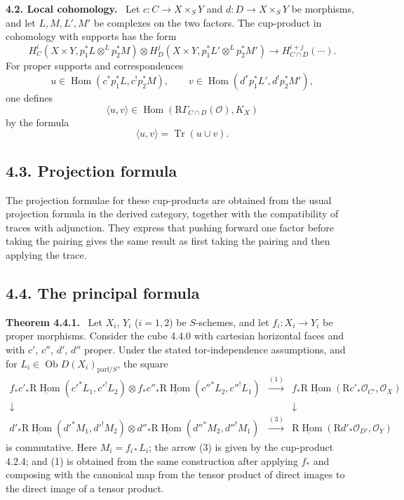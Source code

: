 \documentclass[12pt]{article}
\newcommand{\Hom}{\operatorname{Hom}}
\newcommand{\Tr}{\operatorname{Tr}}
\newcommand{\ob}{\operatorname{Ob}}
\newcommand{\R}{\mathrm R}
\newcommand{\cO}{\mathcal O}
\newenvironment{statement}[1]{\par\medskip\noindent\textbf{#1.}\ }{\par\medskip}
\begin{document}
\begin{statement}{4.2. Local cohomology}
Let $c:C\to X\times_S Y$ and $d:D\to X\times_S Y$ be morphisms, and let $L,M,L',M'$ be complexes on the two factors. The cup-product in cohomology with supports has the form
\begin{equation}
H^i_C(X\times Y,p_1^*L\otimes^L p_2^*M)\otimes
H^j_D(X\times Y,p_1^*L'\otimes^L p_2^*M')
\longrightarrow
H^{i+j}_{C\cap D}(\cdots).
\tag{4.2.1}
\end{equation}
For proper supports and correspondences
\[
   u\in\Hom(c^*p_1^*L,c^!p_2^*M),
   \qquad
   v\in\Hom(d^*p_1^*L',d^!p_2^*M'),
\]
one defines
\begin{equation}
   \langle u,v\rangle\in \Hom(\R\Gamma_{C\cap D}(\cO),K_X)
   \tag{4.2.3}
\end{equation}
by the formula
\begin{equation}
   \langle u,v\rangle=\Tr(u\cup v).
   \tag{4.2.4}
\end{equation}
\end{statement}

\subsection*{4.3. Projection formula}
The projection formulae for these cup-products are obtained from the usual projection formula in the derived category, together with the compatibility of traces with adjunction. They express that pushing forward one factor before taking the pairing gives the same result as first taking the pairing and then applying the trace.

\subsection*{4.4. The principal formula}
\begin{statement}{Theorem 4.4.1}
Let $X_i$, $Y_i$ ($i=1,2$) be $S$-schemes, and let $f_i:X_i\to Y_i$ be proper morphisms. Consider the cube 4.4.0 with cartesian horizontal faces and with $c'$, $c''$, $d'$, $d''$ proper. Under the stated tor-independence assumptions, and for $L_i\in\ob D(X_i)_{\mathrm{parf}/S}$, the square
\[
\begin{array}{ccc}
 f_*c'_*\underline{\R\Hom}(c'^*L_1,c'^!L_2)\otimes
 f_*c''_*\underline{\R\Hom}(c''^*L_2,c''^!L_1)
 & \xrightarrow{(1)} &
 f_*\underline{\R\Hom}(\R c'_*\cO_{C'},\cO_X) \\
 \downarrow & & \downarrow \\
 d'_*\underline{\R\Hom}(d'^*M_1,d'^!M_2)\otimes
 d''_*\underline{\R\Hom}(d''^*M_2,d''^!M_1)
 & \xrightarrow{(3)} &
 \underline{\R\Hom}(\R d'_*\cO_{D'},\cO_Y)
\end{array}
\]
is commutative. Here $M_i=f_{i*}L_i$; the arrow (3) is given by the cup-product 4.2.4; and (1) is obtained from the same construction after applying $f_*$ and composing with the canonical map from the tensor product of direct images to the direct image of a tensor product.
\end{statement}
\end{document}
